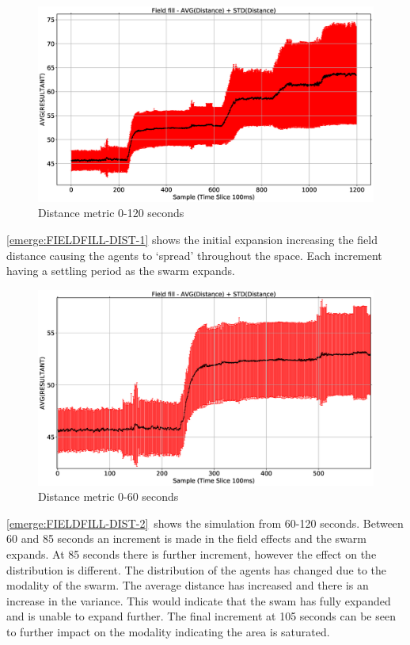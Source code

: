 \begin{figure}[H]
\begin{center}
\includegraphics[width=12cm]{CHAPTER-8/figures/FIELDFILL-DIST}
\end{center}
\caption{Distance metric 0-120 seconds\label{emerge:FIELDFILL-DIST}}
\end{figure}

\autoref{emerge:FIELDFILL-DIST-1} shows the initial expansion increasing the field distance causing the agents to `spread' throughout the space. Each increment having a settling period as the swarm expands.

\begin{figure}[H]
\begin{center}
\includegraphics[width=12cm]{CHAPTER-8/figures/FIELDFILL-DIST-1}
\end{center}
\caption{Distance metric 0-60 seconds\label{emerge:FIELDFILL-DIST-1}}
\end{figure}

\autoref{emerge:FIELDFILL-DIST-2}~shows the simulation from 60-120 seconds. Between 60 and 85 seconds an increment is made in the field effects and the swarm expands. At 85 seconds there is further increment, however the effect on the distribution is different. The distribution of the agents has changed due to the modality of the swarm. The average distance has increased and there is an increase in the variance. This would indicate that the swam has fully expanded and is unable to expand further. The final increment at 105 seconds can be seen to further impact on the modality indicating the area is saturated.

